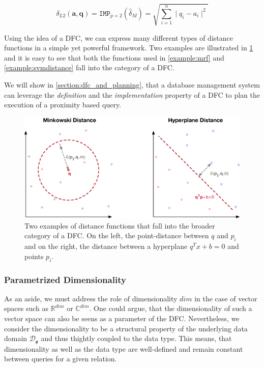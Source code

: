 \begin{equation}
    \delta_{L2}(\mathbf{a},\mathbf{q}) = \texttt{IMP}_{p=2}(\hat{\delta}_M) = \sqrt{\sum_{i=1}^{n} \mid q_i - a_i \mid^2}
\end{equation}

Using the idea of a DFC, we can express many different types of distance functions in a simple yet powerful framework. Two examples are illustrated in \cref{figure:distance_computation} and it is easy to see that both the functions used in \cref{example:mrf} and \cref{example:svmdistance} fall into the category of a DFC.

We will show in \cref{section:dfc_and_planning}, that a database management system can leverage the \emph{definition} and the \emph{implementation} property of a DFC to plan the execution of a proximity based query.

\begin{figure}[bt]
    \centering
    \includegraphics[width=\textwidth]{figures/distance_computations.eps}
    \caption{Two examples of distance functions that fall into the broader category of a DFC. On the left, the point-distance between $q$ and $p_i$ and on the right, the distance between a hyperplane $q^Tx+b = 0$ and points $p_i$.}
    \label{figure:distance_computation}
\end{figure}

\subsubsection{Parametrized Dimensionality}
As an aside, we must address the role of dimensionality $dim$ in the case of vector spaces such as $\mathbb{R}^{dim}$ or $\mathbb{C}^{dim}$. One could argue, that the dimensionality of such a vector space can also be seens as a parameter of the DFC. Nevertheless, we consider the dimensionality to be a structural property of the underlying data domain $\mathcal{D_q}$ and thus thightly coupled to the data type. This means, that dimensionality as well as the data type are well-defined and remain constant between queries for a given relation.

